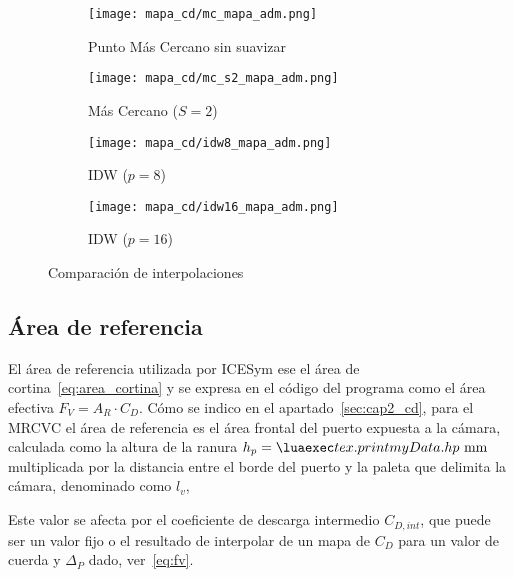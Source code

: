 \begin{figure}
    \centering
    \begin{subfigure}{0.4\textwidth}
        \centering
        \texttt{[image: mapa\_cd/mc\_mapa\_adm.png]}
        \caption{Punto Más Cercano sin suavizar}
    \end{subfigure}
    \hfill
    \begin{subfigure}{0.4\textwidth}
        \centering
        \texttt{[image: mapa\_cd/mc\_s2\_mapa\_adm.png]}
        \caption{Más Cercano ($S=2$)}
    \end{subfigure}
    \hfill
    \begin{subfigure}{0.4\textwidth}
        \centering
        \texttt{[image: mapa\_cd/idw8\_mapa\_adm.png]}
        \caption{IDW ($p=8$)}
    \end{subfigure}
    \hfill
    \begin{subfigure}{0.4\textwidth}
        \centering
        \texttt{[image: mapa\_cd/idw16\_mapa\_adm.png]}
        \caption{IDW ($p=16$)}
    \end{subfigure}
    \caption{Comparación de interpolaciones}\label{fig:mapas_interpolados}
\end{figure}


\subsection{Área de referencia}
%
El área de referencia utilizada por ICESym ese el área de
cortina~\ref{eq:area_cortina} y se expresa en el código del programa como el
área efectiva $F_{V}=A_{R}\cdot C_{D}$.
%
Cómo se indico en el apartado~\ref{sec:cap2_cd}, para el  MRCVC el área de
referencia es el área frontal del puerto expuesta a la cámara, calculada como la
altura de la ranura $h_{p}=\lua{tex.print{myData.hp}}\text{ mm}$ multiplicada
por la distancia entre el borde del puerto y la paleta que delimita la cámara,
denominado como $l_{v}$,

%
%
Este valor se afecta por el coeficiente de descarga intermedio $C_{D,int}$, que
puede ser un valor fijo o el resultado de interpolar de un mapa de $C_D$ para un
valor de cuerda y $\Delta_P$ dado, ver~\ref{eq:fv}.

